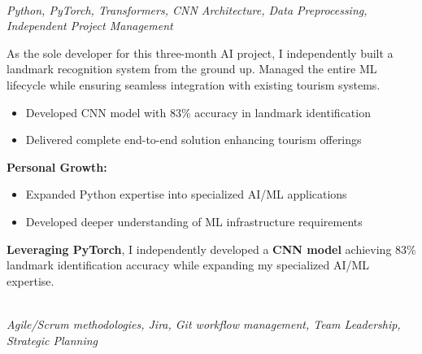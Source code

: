 \documentclass[a4paper,10pt]{article}
\begin{document}
{\begin{minipage}{\dimexpr\textwidth-2\fboxsep\relax}
		\vspace{0.4cm}

        \noindent\uline{} \\
		\vspace{0.1cm} \hspace{0.2cm}
		{\small\textit{Python, PyTorch, Transformers, CNN Architecture, Data Preprocessing, Independent Project Management}}

		As the sole developer for this three-month AI project, I independently built a landmark recognition system from the ground up. Managed the entire ML lifecycle while ensuring seamless integration with existing tourism systems.

		\vspace{0.2cm}
		\begin{itemize}[label=\textcolor{darkblue}{\textbullet}, leftmargin=*, nosep]
			\item Developed CNN model with 83\% accuracy in landmark identification
			\item Delivered complete end-to-end solution enhancing tourism offerings
		\end{itemize}

		\vspace{0.2cm}
		\textbf{Personal Growth:}
		\vspace{0.2cm}
		\begin{itemize}[label=\textcolor{darkblue}{\textbullet}, leftmargin=*, nosep]
			\item Expanded Python expertise into specialized AI/ML applications
			\item Developed deeper understanding of ML infrastructure requirements
		\end{itemize}

		\vspace{0.4cm}

        \textbf{Leveraging PyTorch}, I independently developed a \textbf{CNN model} achieving 83\% landmark identification accuracy while expanding my specialized AI/ML expertise.

		\vspace{0.4cm}

        \noindent\uline{} \\
		\vspace{0.1cm} \hspace{0.2cm}
		{\small\textit{Agile/Scrum methodologies, Jira, Git workflow management, Team Leadership, Strategic Planning}}


\end{minipage}}
\end{document}
